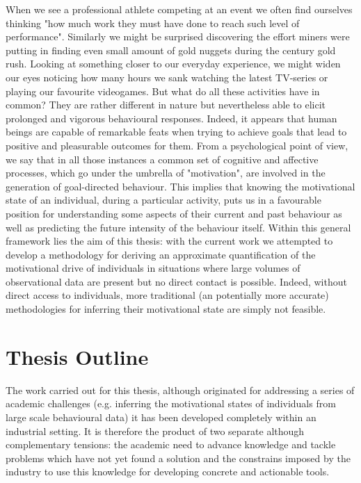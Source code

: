 When we see a professional athlete competing at an event we often find ourselves thinking "how much work they must have done to reach such level of performance". Similarly we might be surprised discovering the effort miners were putting in finding even small amount of gold nuggets during the  century gold rush. Looking at something closer to our everyday experience, we might widen our eyes noticing how many hours we sank watching the latest TV-series or playing our favourite videogames. But what do all these activities have in common? They are rather different in nature but nevertheless able to elicit prolonged and vigorous behavioural responses. Indeed, it appears that human beings are capable of remarkable feats when trying to achieve goals that lead to positive and pleasurable outcomes for them. From a psychological point of view, we say that in all those instances a common set of cognitive and affective processes, which go under the umbrella of "motivation", are involved in the generation of goal-directed behaviour. This implies that knowing the motivational state of an individual, during a particular activity, puts us in a favourable position for understanding some aspects of their current and past behaviour as well as  predicting the future intensity of the behaviour itself. Within this general framework lies the aim of this thesis: with the current work we attempted to develop a methodology for deriving an approximate quantification of the motivational drive of individuals in situations where large volumes of observational data are present but no direct contact is possible. Indeed, without direct access to individuals, more traditional (an potentially more accurate) methodologies for inferring their motivational state are simply not feasible.

\section*{Thesis Outline}
The work carried out for this thesis, although originated for addressing a series of academic challenges (e.g. inferring the motivational states of individuals from large scale behavioural data) it has been developed completely within an industrial setting. It is therefore the product of two separate although complementary tensions: the academic need to advance knowledge and tackle problems which have not yet found a solution and the constrains imposed by the industry to use this knowledge for developing concrete and actionable tools.

